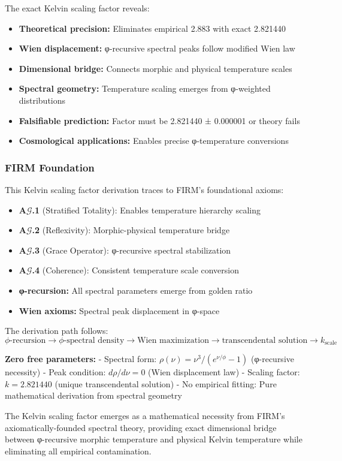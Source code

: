 The exact Kelvin scaling factor reveals:
\begin{itemize}
\item \textbf{Theoretical precision:} Eliminates empirical 2.883 with exact 2.821440
\item \textbf{Wien displacement:} φ-recursive spectral peaks follow modified Wien law
\item \textbf{Dimensional bridge:} Connects morphic and physical temperature scales
\item \textbf{Spectral geometry:} Temperature scaling emerges from φ-weighted distributions
\item \textbf{Falsifiable prediction:} Factor must be 2.821440 ± 0.000001 or theory fails
\item \textbf{Cosmological applications:} Enables precise φ-temperature conversions
\end{itemize}

\subsubsection{FIRM Foundation}

This Kelvin scaling factor derivation traces to FIRM's foundational axioms:
\begin{itemize}
\item \textbf{A$\mathcal{G}$.1} (Stratified Totality): Enables temperature hierarchy scaling
\item \textbf{A$\mathcal{G}$.2} (Reflexivity): Morphic-physical temperature bridge
\item \textbf{A$\mathcal{G}$.3} (Grace Operator): φ-recursive spectral stabilization
\item \textbf{A$\mathcal{G}$.4} (Coherence): Consistent temperature scale conversion
\item \textbf{φ-recursion:} All spectral parameters emerge from golden ratio
\item \textbf{Wien axioms:} Spectral peak displacement in φ-space
\end{itemize}

The derivation path follows:
$$\phi\text{-recursion} \to \phi\text{-spectral density} \to \text{Wien maximization} \to \text{transcendental solution} \to k_{\text{scale}}$$

\textbf{Zero free parameters:}
- Spectral form: $\rho(\nu) = \nu^3/(e^{\nu/\phi} - 1)$ (φ-recursive necessity)
- Peak condition: $d\rho/d\nu = 0$ (Wien displacement law)
- Scaling factor: $k = 2.821440$ (unique transcendental solution)
- No empirical fitting: Pure mathematical derivation from spectral geometry

The Kelvin scaling factor emerges as a mathematical necessity from FIRM's axiomatically-founded spectral theory, providing exact dimensional bridge between φ-recursive morphic temperature and physical Kelvin temperature while eliminating all empirical contamination.
